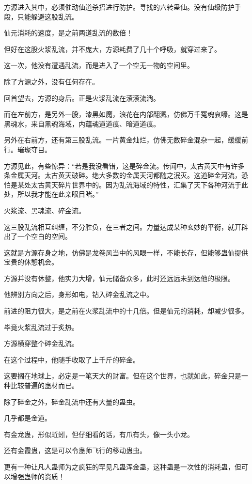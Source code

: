 \begin{this_body}
方源进入其中，必须催动仙道杀招进行防护。寻找的六转蛊仙。没有仙级防护手段，只能躲避这股乱流。

仙元消耗的速度，是之前两道乱流的数倍！

但好在这股火浆乱流，并不庞大，方源耗费了几十个呼吸，就穿过来了。

这一次，他没有遭遇乱流，而是进入了一个空无一物的空间里。

除了方源之外，没有任何存在。

回首望去，方源的身后。正是火浆乱流在滚滚流淌。

而在左前方，是另外一股，漆黑如魔，浪花在内部翻溅，仿佛万千冤魂哀嚎。这是黑魂水，来自黑魂海域，内蕴魂道道痕、暗道道痕。

另外在右前方，还有第三股乱流。一片黄金灿烂，仿佛无数碎金混杂一起，缓缓前行。璀璨夺目。

方源见此，有些惊异：“若是我没看错，这是碎金流。传闻中，太古黄天中有许多条金属天河。太古黄天破碎。绝大多数的金属天河都随之泯灭。这道碎金河流，恐怕是某处太古黄天碎片世界中的。因为乱流海域的特性，汇集了天下各种河流于此处，所以我才能在此亲眼目睹。”

火浆流、黑魂流、碎金流。

这三股乱流相互纠缠，不分胜负，在三者之间。力量达成某种玄妙的平衡，就开辟出了一个空白的空间。

这就是方源存身之地，仿佛是龙卷风当中的风眼一样，不能长存，但能够蛊仙提供宝贵的休憩机会。

方源并没有休整，他实力大增，仙元储备众多，此时还远远未到达他的极限。

他辨别方向之后，身形如电，钻入碎金乱流之中。

前进的阻力很大，是之前在火浆乱流中的十几倍。但是仙元的消耗，却减少很多。

毕竟火浆乱流过于炙热。

方源横穿整个碎金乱流。

在这个过程中，他随手收取了上千斤的碎金。

这要搁在地球上，必定是一笔天大的财富。但在这个世界，也就如此，碎金只是一种比较普遍的蛊材而已。

除了碎金之外，碎金乱流中还有大量的蛊虫。

几乎都是金道。

有金龙蛊，形似蚯蚓，但仔细看的话，有爪有头，像一头小龙。

还有金霞蛊，这是可以令蛊师飞行的移动蛊虫。

更有一种让凡人蛊师为之疯狂的罕见凡蛊浑金蛊，这种蛊是一次性的消耗蛊，但可以增强蛊师的资质！


\end{this_body}

